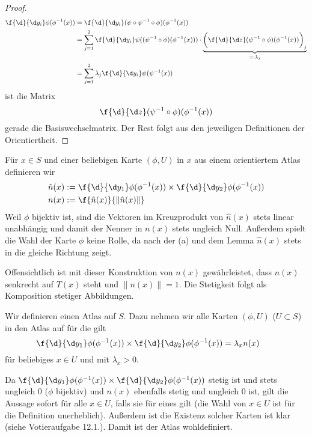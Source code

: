 \documentclass[a4paper]{scrartcl}
\begin{document}
\begin{aufgabe}
\begin{enumerate}[(a)]
\begin{lem*}
\begin{proof}
\begin{align*}
						\f{\d}{\d y_i} \phi(\phi^{-1}(x))
						&= \f{\d}{\d y_i} (\psi \circ \psi^{-1} \circ \phi)(\phi^{-1}(x)) \\
						&= \sum_{j=1}^2 \f {\d}{\d y_i} \psi((\psi^{-1}\circ \phi)(\phi^{-1}(x))) \cdot \underbrace{\bigg( \f{\d}{\d z} (\psi^{-1} \circ \phi)(\phi^{-1}(x))\bigg)_j}_{=:\lambda_j} \\
						&= \sum_{j=1}^2 \lambda_j \f{\d}{\d y_i}\psi(\psi^{-1}(x))
					\end{align*}
					ist die Matrix
					\[
						\f{\d}{\d z} (\psi^{-1}\circ \phi)(\phi^{-1}(x))
					\]
					gerade die Basiswechselmatrix.
					Der Rest folgt aus den jeweiligen Definitionen der Orientiertheit.
				\end{proof}
			\end{lem*}
			\begin{seg}[„$\implies$“]
				Für $x\in S$ und einer beliebigen Karte $(\phi, U)$ in $x$ aus einem orientiertem Atlas definieren wir
				\begin{align*}
					\hat n(x) &:= \f{\d}{\d y_1}\phi(\phi^{-1}(x)) \times \f{\d}{\d y_2} \phi(\phi^{-1}(x)) \\
					n(x) &:= \f{\hat n(x)}{\|\hat n(x)\|}
				\end{align*}
				Weil $\phi$ bijektiv ist, sind die Vektoren im Kreuzprodukt von $\hat n(x)$ stets linear unabhängig und damit der Nenner in $n(x)$ stets ungleich Null.
				Außerdem spielt die Wahl der Karte $\phi$ keine Rolle, da nach der (a) und dem Lemma $\hat n(x)$ stets in die gleiche Richtung zeigt.

				Offensichtlich ist mit dieser Konstruktion von $n(x)$ gewährleistet, dass $n(x)$ senkrecht auf $T(x)$ steht und $\|n(x)\|=1$.
				Die Stetigkeit folgt als Komposition stetiger Abbildungen.
			\end{seg}
			\begin{seg}[„$\Longleftarrow$“]
				Wir definieren einen Atlas auf $S$.
				Dazu nehmen wir alle Karten $(\phi, U)$ ($U\subset S$) in den Atlas auf für die gilt
				\[
					\f{\d}{\d y_1}\phi(\phi^{-1}(x)) \times \f{\d}{\d y_2} \phi(\phi^{-1}(x))
					= \lambda_x n(x) \qquad 
				\]
				für beliebiges $x \in U$ und mit $\lambda_x > 0$.
				
				Da $\f{\d}{\d y_1}\phi(\phi^{-1}(x)) \times \f{\d}{\d y_2} \phi(\phi^{-1}(x))$ stetig ist und stets ungleich $0$ ($\phi$ bijektiv) und $n(x)$ ebenfalls stetig und ungleich $0$ ist, gilt die Aussage sofort für alle $x\in U$, falls sie für eines gilt (die Wahl von $x\in U$ ist für die Definition unerheblich).
				Außerdem ist die Existenz solcher Karten ist klar (siehe Votieraufgabe 12.1.).
				Damit ist der Atlas wohldefiniert.


\end{seg}
\end{enumerate}
\end{aufgabe}
\end{document}
